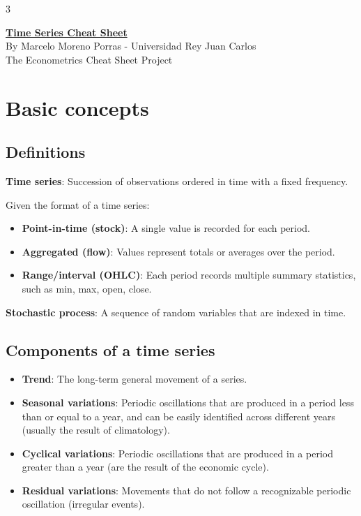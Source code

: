 \documentclass[10pt, a4paper, landscape]{article}
\begin{document}
\begin{multicols}{3}

\begin{center}
	\textbf{\LARGE \href{https://github.com/marcelomijas/econometrics-cheatsheet}{Time Series Cheat Sheet}} \\
	{\footnotesize By Marcelo Moreno Porras - Universidad Rey Juan Carlos} \\
	{\footnotesize The Econometrics Cheat Sheet Project}
\end{center}

\section*{Basic concepts}

\subsection*{Definitions}

\textbf{Time series}: Succession of observations ordered in time with a fixed frequency.

Given the format of a time series:

\begin{itemize}[leftmargin=*]
	\item \textbf{Point-in-time (stock)}: A single value is recorded for each period.
	\item \textbf{Aggregated (flow)}: Values represent totals or averages over the period.
	\item \textbf{Range/interval (OHLC)}: Each period records multiple summary statistics, such as min, max, open, close.
\end{itemize}

\textbf{Stochastic process}: A sequence of random variables that are indexed in time.

\subsection*{Components of a time series}

\begin{itemize}[leftmargin=*]
	\item \textbf{Trend}: The long-term general movement of a series.
	\item \textbf{Seasonal variations}: Periodic oscillations that are produced in a period less than or equal to a year, and can be easily identified across different years (usually the result of climatology).
	\item \textbf{Cyclical variations}: Periodic oscillations that are produced in a period greater than a year (are the result of the economic cycle).
	\item \textbf{Residual variations}: Movements that do not follow a recognizable periodic oscillation (irregular events).
\end{itemize}


\end{multicols}
\end{document}
